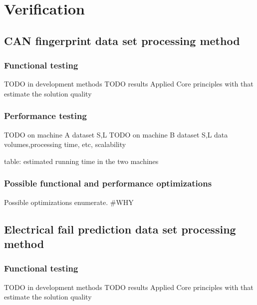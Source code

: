 \chapter{Verification}
\section{CAN fingerprint data set processing method}
\subsection{Functional testing}
TODO in development methods
TODO results
Applied Core principles with that estimate the solution quality
\subsection{Performance testing}
TODO on machine A dataset S,L
TODO on machine B dataset S,L
	data volumes,processing time, etc, scalability

table: estimated running time in the two machines
\subsection{Possible functional and performance optimizations}
Possible optimizations enumerate.
\#WHY
\section{Electrical fail prediction data set processing method}
\subsection{Functional testing}
TODO in development methods
TODO results
Applied Core principles with that estimate the solution quality
